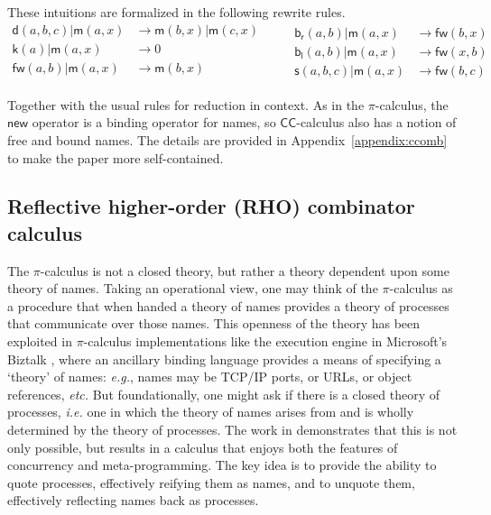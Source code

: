 \documentclass[submission,copyright,creativecommons]{eptcs}
\newcommand{\new}{\mathsf{new}}
\newcommand{\pic}{$\pi$-calculus}
\newcommand{\ccomb}{$\mathsf{CC}$-calculus}
\newcommand{\red}{\rightarrow}
\theoremstyle{definition}
\theoremstyle{remark}
\theoremstyle{remark}
\begin{document}
These intuitions are formalized in the following rewrite rules.
\[\begin{array}{rl}
  \mathsf{d}(a,b,c) | \mathsf{m}(a,x) & \red \mathsf{m}(b,x) | \mathsf{m}(c,x) \\
  \mathsf{k}(a) | \mathsf{m}(a,x) & \red 0 \\
  \mathsf{fw}(a,b) | \mathsf{m}(a,x) & \red \mathsf{m}(b,x) \\
\end{array} \quad \quad
\begin{array}{rl}
  \mathsf{b}_{\mathsf{r}}(a,b) | \mathsf{m}(a,x) & \red \mathsf{fw}(b,x) \\
  \mathsf{b}_{\mathsf{l}}(a,b) | \mathsf{m}(a,x) & \red \mathsf{fw}(x,b) \\
  \mathsf{s}(a,b,c) | \mathsf{m}(a,x) & \red \mathsf{fw}(b,c)
\end{array}\]

Together with the usual rules for reduction in context.
As in the {\pic}, the $\new$ operator is a binding operator for names,
so {\ccomb} also has a notion of free and bound names. The
details are provided in Appendix~\ref{appendix:ccomb} to make the paper more
self-contained.

\subsection{Reflective higher-order (RHO) combinator calculus}
The {\pic} is not a closed theory, but rather a theory dependent upon
some theory of names. Taking an operational view, one may think of the
{\pic} as a procedure that when handed a theory of names provides a
theory of processes that communicate over those names. This openness
of the theory has been exploited in {\pic} implementations like the
execution engine in Microsoft's Biztalk \cite{biztalk}, where an
ancillary binding language provides a means of specifying a `theory'
of names: {\em e.g.}, names may be TCP/IP ports, or URLs, or object
references, {\em etc.}  But foundationally, one might ask if there is
a closed theory of processes, {\em i.e.} one in which the theory of
names arises from and is wholly determined by the theory of
processes. The work in \cite{DBLP:journals/entcs/MeredithR05}
demonstrates that this is not only possible, but results in a calculus
that enjoys both the features of concurrency and meta-programming. The
key idea is to provide the ability to quote processes, effectively
reifying them as names, and to unquote them, effectively reflecting
names back as processes.
\end{document}
